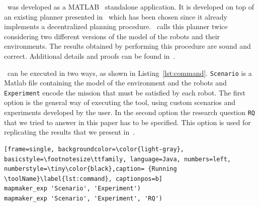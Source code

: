
\toolName\  was developed as a  MATLAB~\cite{matlab} standalone application.
It is developed on top of an existing  planner presented in~\cite{tumova2016multi} which has been chosen since it already implements a decentralized planning procedure.
\toolName\ calls this planner twice considering two different versions of the model of the robots and their environments. 
The results obtained by performing this procedure are sound and correct.
Additional details and proofs can be found in~\cite{mapmaker17}.


\toolName\ can be executed in two ways, as shown in Listing~\ref{lst:command}.
\texttt{Scenario} is a Matlab file containing the model of the environment and the robots and \texttt{Experiment} encode the mission that must be satisfied by each robot.
The first option is the general way of executing the tool, using custom scenarios and experiments developed by the user.
In the second option the research question \texttt{RQ} that we tried to answer in this paper has to be specified.
This option is used for replicating the results that we present in~\cite{mapmaker17}.

\begin{lstlisting}[frame=single, backgroundcolor=\color{light-gray}, basicstyle=\footnotesize\ttfamily, language=Java, numbers=left, numberstyle=\tiny\color{black},caption= {Running \toolName}\label{lst:command}, captionpos=b]
mapmaker_exp 'Scenario', 'Experiment')
mapmaker_exp 'Scenario', 'Experiment', 'RQ')
\end{lstlisting}







